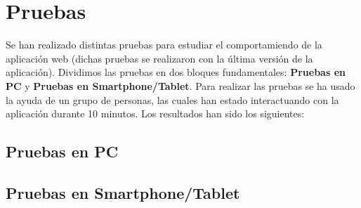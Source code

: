 \chapter{Pruebas}

Se han realizado distintas pruebas para estudiar el comportamiendo de la aplicación web (dichas pruebas se realizaron con la última versión de la aplicación). Dividimos las pruebas en dos bloques fundamentales: \textbf{Pruebas en PC} y \textbf{Pruebas en Smartphone/Tablet}. Para realizar las pruebas se ha usado la ayuda de un grupo de personas, las cuales han estado interactuando con la aplicación durante 10 minutos. Los resultados han sido los siguientes:

\section{Pruebas en PC}

\section{Pruebas en Smartphone/Tablet}